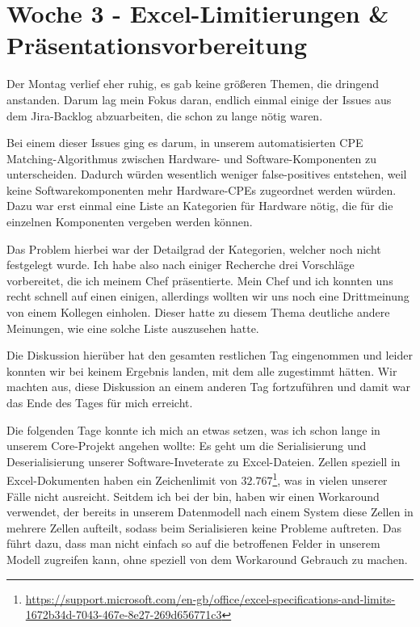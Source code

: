 \section{Woche 3 - Excel-Limitierungen \& Präsentationsvorbereitung} \label{sec:bericht-wo-3}

Der Montag verlief eher ruhig, es gab keine größeren Themen, die dringend anstanden.
Darum lag mein Fokus daran, endlich einmal einige der Issues aus dem Jira-Backlog abzuarbeiten, die schon zu lange nötig waren.

Bei einem dieser Issues ging es darum, in unserem automatisierten CPE Matching-Algorithmus zwischen Hardware- und Software-Komponenten zu unterscheiden.
Dadurch würden wesentlich weniger false-positives entstehen, weil keine Softwarekomponenten mehr Hardware-CPEs zugeordnet werden würden.
Dazu war erst einmal eine Liste an Kategorien für Hardware nötig, die für die einzelnen Komponenten vergeben werden können.

Das Problem hierbei war der Detailgrad der Kategorien, welcher noch nicht festgelegt wurde.
Ich habe also nach einiger Recherche drei Vorschläge vorbereitet, die ich meinem Chef präsentierte.
Mein Chef und ich konnten uns recht schnell auf einen einigen, allerdings wollten wir uns noch eine Drittmeinung von einem Kollegen einholen.
Dieser hatte zu diesem Thema deutliche andere Meinungen, wie eine solche Liste auszusehen hatte.

Die Diskussion hierüber hat den gesamten restlichen Tag eingenommen und leider konnten wir bei keinem Ergebnis landen, mit dem alle zugestimmt hätten.
Wir machten aus, diese Diskussion an einem anderen Tag fortzuführen und damit war das Ende des Tages für mich erreicht.


Die folgenden Tage konnte ich mich an etwas setzen, was ich schon lange in unserem Core-Projekt angehen wollte:
Es geht um die Serialisierung und Deserialisierung unserer Software-Inveterate zu Excel-Dateien.
Zellen speziell in Excel-Dokumenten haben ein Zeichenlimit von $32.767$\footnote{\url{https://support.microsoft.com/en-gb/office/excel-specifications-and-limits-1672b34d-7043-467e-8e27-269d656771c3}}, was in vielen unserer Fälle nicht ausreicht.
Seitdem ich bei der \metaeffekt bin, haben wir einen Workaround verwendet, der bereits in unserem Datenmodell nach einem System diese Zellen in mehrere Zellen aufteilt, sodass beim Serialisieren keine Probleme auftreten.
Das führt dazu, dass man nicht einfach so auf die betroffenen Felder in unserem Modell zugreifen kann, ohne speziell von dem Workaround Gebrauch zu machen.

